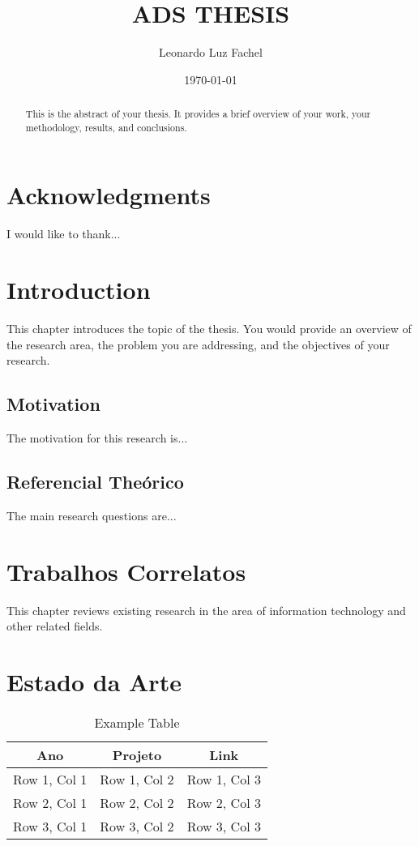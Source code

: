 \documentclass[12pt, a4paper]{report} %
\title{ADS THESIS}
\author{Leonardo Luz Fachel}
\date{\today} %
\begin{document}
\maketitle

\begin{abstract}
This is the abstract of your thesis. It provides a brief overview of your work, your methodology, results, and conclusions.
\end{abstract}

\chapter*{Acknowledgments}
I would like to thank...

\tableofcontents
\newpage

\listoffigures
\listoftables
\newpage


\chapter{Introduction}
This chapter introduces the topic of the thesis. You would provide an overview of the research area, the problem you are addressing, and the objectives of your research.

\section{Motivation}
The motivation for this research is...

\section{Referencial Theórico}
The main research questions are...

\chapter{Trabalhos Correlatos}
This chapter reviews existing research in the area of information technology and other related fields.

\chapter{Estado da Arte}
\begin{table}[h!]
\centering
\begin{tabular}{|c|c|c|}
\hline
Ano & Projeto & Link \\ \hline
Row 1, Col 1 & Row 1, Col 2 & Row 1, Col 3 \\ \hline
Row 2, Col 1 & Row 2, Col 2 & Row 2, Col 3 \\ \hline
Row 3, Col 1 & Row 3, Col 2 & Row 3, Col 3 \\ \hline
\end{tabular}
\caption{Example Table}
\end{table}
\end{document}
